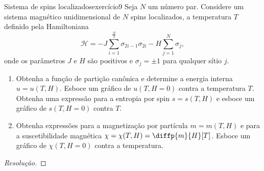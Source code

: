 \begin{exercício}{Sistema de spins localizados}{exercício9}
    Seja \(N\) um número par. Considere um sistema magnético unidimensional de \(N\) spins localizados, a temperatura \(T\) definido pela Hamiltoniana
    \begin{equation*}
        \mathcal{H} = -J \sum_{i = 1}^{\frac{N}{2}} \sigma_{2i-1}\sigma_{2i} - H \sum_{j=1}^{N} \sigma_j,
    \end{equation*}
    onde os parâmetros \(J\) e \(H\) são positivos e \(\sigma_j = \pm 1\) para qualquer sítio \(j\).
    \begin{enumerate}[label=(\alph*)]
        \item Obtenha a função de partição canônica e determine a energia interna \(u = u(T, H)\). Esboce um gráfico de \(u(T, H = 0)\) contra a temperatura \(T\). Obtenha uma expressão para a entropia por spin \(s = s(T, H)\) e esboce um gráfico de \(s(T, H = 0)\) contra \(T\).
        \item Obtenha expressões para a magnetização por partícula \(m = m(T, H)\) e para a suscetibilidade magnética \(\chi = \chi(T, H) = \diffp{m}{H}[T]\). Esboce um gráfico de \(\chi(T, H = 0)\) contra a temperatura.
    \end{enumerate}
\end{exercício}
\begin{proof}[Resolução]

\end{proof}
